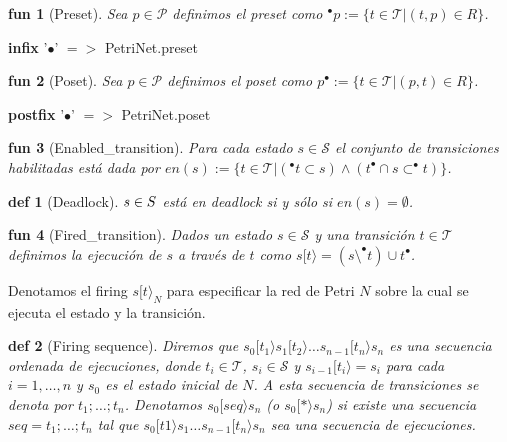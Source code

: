\documentclass{article}
\newtheorem{defi}{def}
\newtheorem{fun}{fun}
\newcommand{\Tr}{\mathcal{T}}
\newcommand{\St}{\mathcal{S}}
\newcommand{\pres}[1]{^{\bullet}{#1}}
\newcommand{\pos}[1]{{#1}^{\bullet}}
\begin{document}
\begin{fun}[Preset] \rm{Sea $p\in \mathcal P$ definimos el preset como} $^{\bullet}p := \{t\in \mathcal T|(t,p)\in R\}$.
\end{fun}

\textbf{infix} '$\bullet$' $=>$ PetriNet.preset

\begin{fun}[Poset] \rm{Sea $p\in \mathcal P$ definimos el poset como} $ p^{\bullet} := \{t\in \mathcal T|(p,t)\in R\}$.
\end{fun}


\textbf{postfix} '$\bullet$' $=>$ PetriNet.poset


\begin{fun}[Enabled\_transition] \rm{Para cada estado $s\in \mathcal S$ el conjunto de transiciones habilitadas está dada por} $en(s) := \{t \in \Tr | (\pres{t} \subset s) \wedge (\pos{t}\cap s\subset \pres{t})\}$.
\end{fun}

\begin{defi}[Deadlock] $s\in \mathcal \St$\rm{ está en deadlock si y sólo si } $en(s)=\emptyset$.

\end{defi}


\begin{fun}[Fired\_transition]
\rm{Dados un estado $s\in \St$ y una transición $t\in \Tr$ definimos la ejecución de $s$ a través de $t$ como $s[t\rangle =(s\setminus ^{\bullet}t)\cup t^{\bullet}$}.
\end{fun}

Denotamos el firing $s[t\rangle_N$ para especificar la red de Petri $N$ sobre la cual se ejecuta el estado y la transición.

\begin{defi}[Firing sequence]\rm{Diremos que $s_0[t_1\rangle s_1[t_2\rangle\dots s_{n-1}[t_n\rangle s_n$ es una secuencia ordenada de ejecuciones, donde $t_i\in\Tr$, $s_i\in\St$ y $s_{i-1}[t_i\rangle = s_i$ para cada $i=1,\dots,n$ y $s_0$ es el estado inicial de $N$.
 A esta secuencia de transiciones se denota por $t_1;\dots;t_n$.
Denotamos $s_0[seq\rangle s_n$ (o $s_0[*\rangle s_n$) si existe una secuencia $seq=t_1;\dots;t_n$ tal que $s_0[t1\rangle s_1\dots  s_{n-1}[t_n\rangle s_n$ sea una secuencia de ejecuciones.}
\end{defi}

\end{document}
